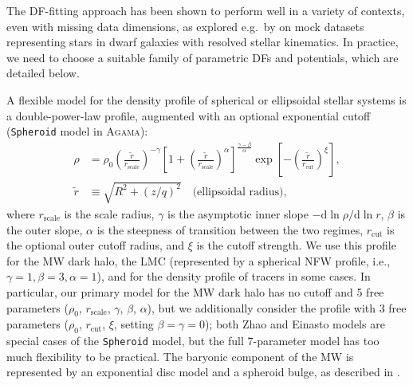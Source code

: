 \documentclass[usenatbib,fleqn]{mnras}
\begin{document}
The DF-fitting approach has been shown to perform well in a variety of contexts, even with missing data dimensions, as explored e.g.\ by \citet{Read2021} on mock datasets representing stars in dwarf galaxies with resolved stellar kinematics. In practice, we need to choose a suitable family of parametric DFs and potentials, which are detailed below.

A flexible model for the density profile of spherical or ellipsoidal stellar systems is a double-power-law \citet{Zhao1996} profile, augmented with an optional exponential cutoff (\texttt{Spheroid} model in \textsc{Agama}):
\begin{equation}  \label{eq:spheroid_density}
\begin{aligned}
\rho &= \rho_0 \left (\frac{\tilde r}{r_\text{scale}} \right)^{-\gamma}
\left [1+\left (\frac{\tilde r}{r_\text{scale}} \right)^{\alpha} \right]^{\frac{\gamma - \beta}{\alpha}} \!\!
\exp\left[-\left (\frac{\tilde r}{r_\text{cut}}\right)^\xi \right] , \\
\tilde r &\equiv \sqrt{R^2+(z/q)^2}\quad \mbox{(ellipsoidal radius)} ,
\end{aligned}
\end{equation}
where $r_\text{scale}$ is the scale radius, $\gamma$ is the asymptotic inner slope $-\mathrm{d}\ln\rho/\mathrm{d}\ln r$, $\beta$ is the outer slope, $\alpha$ is the steepness of transition between the two regimes, $r_\text{cut}$ is the optional outer cutoff radius, and $\xi$ is the cutoff strength. We use this profile for the MW dark halo, the LMC (represented by a spherical NFW profile, i.e., $\gamma=1, \beta=3, \alpha=1$), and for the density profile of tracers in some cases. In particular, our primary model for the MW dark halo has no cutoff and 5 free parameters ($\rho_0$, $r_\text{scale}$, $\gamma$, $\beta$, $\alpha$), but we additionally consider the \citet{Einasto1965} profile with 3 free parameters ($\rho_0$, $r_\text{cut}$, $\xi$, setting $\beta=\gamma=0$); both Zhao and Einasto models are special cases of the \texttt{Spheroid} model, but the full 7-parameter model has too much flexibility to be practical. The baryonic component of the MW is represented by an exponential disc model and a spheroid bulge, as described in \citet{McMillan2017}.
\end{document}
